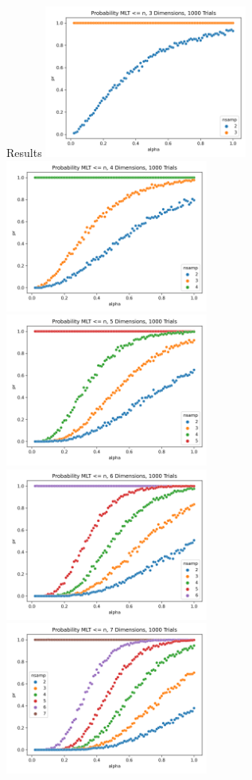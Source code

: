 \documentclass[final]{beamer}
\newlength{\colwidth}
\begin{document}
\begin{frame}[t]
\begin{columns}[t]
\begin{column}{\colwidth}
  \begin{block}{Results}
\includegraphics[width = 0.5\textwidth]{figures/3dPlot.png}
\includegraphics[width = 0.5\textwidth]{figures/4dPlot.png}
\includegraphics[width = 0.5\textwidth]{figures/5dPlot.png}
\includegraphics[width = 0.5\textwidth]{figures/6dPlot.png}
\includegraphics[width = 0.5\textwidth]{figures/7dPlot.png}

\end{block}
\end{column}
\end{columns}
\end{frame}
\end{document}
